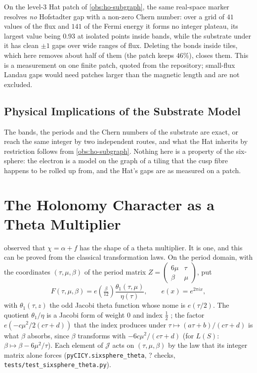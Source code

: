 \documentclass[11pt,a4paper]{article}
\newcommand{\SSThChecks}{?}\newcommand{\SSThDigits}{?}\newcommand{\SSThWords}{?}
\theoremstyle{plain}
\theoremstyle{definition}
\begin{document}
On the level-$3$ Hat patch of \cref{obs:ho-subgraph}, the same real-space marker resolves
\emph{no} Hofstadter gap with a non-zero Chern number: over a grid of $41$ values of the flux
and $141$ of the Fermi energy it forms no integer plateau, its largest value being $0.93$ at isolated points inside bands, while the substrate under it has clean
$\pm1$ gaps over wide ranges of flux. Deleting the bonds inside tiles, which here removes about half
of them (the patch keeps $46\%$), closes them. This is a measurement on one finite patch, quoted from the repository; small-flux Landau gaps would need patches larger than the
magnetic length and are not excluded.

\subsection{Physical Implications of the Substrate Model}

The bands, the periods and the Chern numbers of the substrate are exact, or reach the same
integer by two independent routes, and what the Hat inherits by restriction follows from
\cref{obs:ho-subgraph}. Nothing here is a property of the six-sphere: the electron is a model on the graph of
a tiling that the cusp fibre happens to be rolled up from, and the Hat's gaps are as measured on a patch.


\section{The Holonomy Character as a Theta Multiplier}
\label{sec:theta}

 observed that $\chi=\alpha+f$ has the shape of a theta multiplier. It is one, and this can be
proved from the classical transformation laws. On the period domain, with the coordinates
$(\tau,\mu,\beta)$ of the period matrix $Z=\left(\begin{smallmatrix}6\mu&\tau\\\beta&\mu\end{smallmatrix}\right)$, put
\[
  F(\tau,\mu,\beta)=e\!\left(\tfrac{\beta}{12}\right)\frac{\theta_1(\tau,\mu)}{\eta(\tau)},\qquad e(x)=e^{2\pi ix},
\]
with $\theta_1(\tau,z)$ the odd Jacobi theta function whose nome is $e(\tau/2)$. The quotient $\theta_1/\eta$ is a
Jacobi form of weight $0$ and index $\tfrac12$ \cite{EichlerZagier}; the factor $e(-c\mu^2/2(c\tau+d))$ that the index produces under
$\tau\mapsto(a\tau+b)/(c\tau+d)$ is what $\beta$ absorbs, since $\beta$ transforms with $-6c\mu^2/(c\tau+d)$
(for $L(S)$: $\beta\mapsto\beta-6\mu^2/\tau$). Each element of $\mathcal J$ acts on $(\tau,\mu,\beta)$ by the law that
its integer matrix alone forces (\texttt{pyCICY.sixsphere\_theta}, \SSThChecks{} checks, \texttt{tests/test\_sixsphere\_theta.py}).
\end{document}
